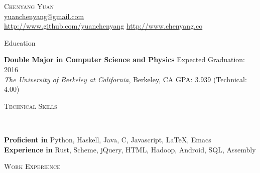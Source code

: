 \documentclass[9pt]{article}
\newenvironment{changemargin}[2]{%
  \begin{list}{}{%
      \setlength{\topsep}{0pt}%
      \setlength{\leftmargin}{#1}%
      \setlength{\rightmargin}{#2}%
      \setlength{\listparindent}{\parindent}%
      \setlength{\itemindent}{\parindent}%
      \setlength{\parsep}{\parskip}%
    }%
  \item[]}{\end{list}
}
\newcommand{\lineover}{
  \begin{changemargin}{-0.05in}{-0.05in}
    \vspace*{-8pt}
    \hrulefill \\
    \vspace*{-2pt}
  \end{changemargin}
}
\newcommand{\header}[1]{
  \begin{changemargin}{-0.5in}{-0.5in}
    \scshape{#1}\\
    \lineover
  \end{changemargin}
}
\newcommand{\contact}[4]{
  \begin{changemargin}{-0.5in}{-0.5in}
    \begin{center}
      {\Large \scshape {#1}}\\ \smallskip
      {#2}\\ \smallskip
      {#3}\\ \smallskip
      {#4}\smallskip
    \end{center}
  \end{changemargin}
}
\newenvironment{body} {
  \vspace*{-16pt}
  \begin{changemargin}{-0.25in}{-0.5in}
  }
  {\end{changemargin}
}
\begin{document}
\contact{Chenyang Yuan}{\href{mailto:yuanchenyang@gmail.com}{yuanchenyang@gmail.com}}{ \url{http://www.github.com/yuanchenyang} \quad \url{http://www.chenyang.co}}

\header{Education}

\begin{body}
  \vspace{14pt}
  \textbf{Double Major in Computer Science and Physics} \hfill Expected Graduation: 2016 \\
  \emph{The University of Berkeley at California}, Berkeley, CA{} \hfill GPA: 3.939 (Technical: 4.00)\\
\end{body}

\smallskip

\header{Technical Skills}

\begin{body}
  \vspace{14pt}
  \textbf{Proficient in} Python, Haskell, Java, C, Javascript, \LaTeX, Emacs \\
  \textbf{Experience in} Rust, Scheme, jQuery, HTML, Hadoop, Android, SQL, Assembly
\end{body}

\smallskip



\header{Work Experience}
\end{document}
